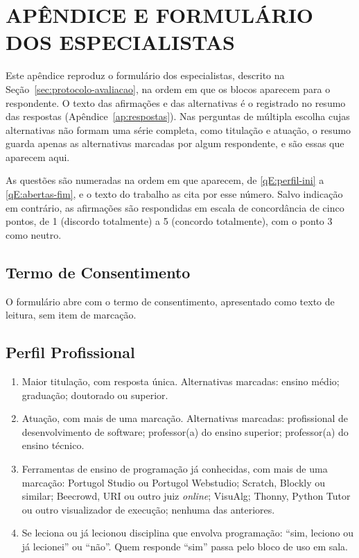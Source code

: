 \chapter[APÊNDICE E -- FORMULÁRIO DOS ESPECIALISTAS]{{\centering APÊNDICE E \textendash{} FORMULÁRIO DOS ESPECIALISTAS}}  \label{ap:formulario-especialistas}
\newenvironment{questoes}[1]{\def\qcounter{#1}\renewcommand{\theenumi}{Q\arabic{enumi}}\renewcommand{\labelenumi}{\theenumi.}\begin{enumerate}\setcounter{enumi}{\value{#1}}}{\setcounter{\qcounter}{\value{enumi}}\end{enumerate}}

Este apêndice reproduz o formulário dos especialistas, descrito na Seção~\ref{sec:protocolo-avaliacao}, na ordem em que os blocos aparecem para o respondente. O texto das afirmações e das alternativas é o registrado no resumo das respostas (Apêndice~\ref{ap:respostas}). Nas perguntas de múltipla escolha cujas alternativas não formam uma série completa, como titulação e atuação, o resumo guarda apenas as alternativas marcadas por algum respondente, e são essas que aparecem aqui.

As questões são numeradas na ordem em que aparecem, de \ref{qE:perfil-ini} a \ref{qE:abertas-fim}, e o texto do trabalho as cita por esse número. Salvo indicação em contrário, as afirmações são respondidas em escala de concordância de cinco pontos, de 1 (discordo totalmente) a 5 (concordo totalmente), com o ponto 3 como neutro.

\section{Termo de Consentimento}

O formulário abre com o termo de consentimento, apresentado como texto de leitura, sem item de marcação.

\section{Perfil Profissional}

\begin{questoes}{qE}
    \item\label{qE:perfil-ini} Maior titulação, com resposta única. Alternativas marcadas: ensino médio; graduação; doutorado ou superior.
    \item Atuação, com mais de uma marcação. Alternativas marcadas: profissional de desenvolvimento de software; professor(a) do ensino superior; professor(a) do ensino técnico.
    \item Ferramentas de ensino de programação já conhecidas, com mais de uma marcação: Portugol Studio ou Portugol Webstudio; Scratch, Blockly ou similar; Beecrowd, URI ou outro juiz \textit{online}; VisuAlg; Thonny, Python Tutor ou outro visualizador de execução; nenhuma das anteriores.
    \item\label{qE:perfil-fim} Se leciona ou já lecionou disciplina que envolva programação: ``sim, leciono ou já lecionei'' ou ``não''. Quem responde ``sim'' passa pelo bloco de uso em sala.
\end{questoes}

